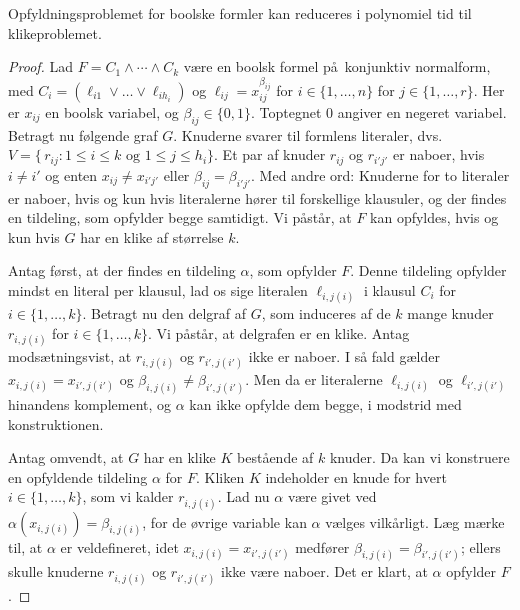 \begin{lemma} 
  Opfyldningsproblemet for boolske formler kan reduceres i polynomiel tid til klikeproblemet.
\end{lemma}

\begin{proof} 
  Lad $F = C_1 \wedge \cdots \wedge C_k$ være en boolsk formel på konjunktiv normalform, med 
  $C_i = (\ell_{i1} \vee \ldots \vee \ell_{ih_i})$ og $\ell_{ij} = x_{ij}^{\beta_{ij}}$ for $i\in\{1,\ldots, n\}$ for $j\in\{1,\ldots,r\}$. 
  Her er $x_{ij}$ en boolsk variabel, og $\beta_{ij} \in \{0,1\}$.
  Toptegnet $0$ angiver en negeret variabel. 
  Betragt nu følgende graf $G$.
  Knuderne svarer til formlens literaler, dvs.  $V = \{\,r_{ij}\colon 1 \le i \le k \text{ og } 1 \le j \le h_i\}$.
  Et par af knuder $r_{ij}$ og $r_{i'j'}$ er naboer, hvis $i \not= i'$ og enten $x_{ij} \not= x_{i'j'}$ eller $\beta_{ij} = \beta_{i'j'}$.
  Med andre ord:
  Knuderne for to literaler er naboer, hvis og kun hvis literalerne hører til forskellige klausuler, og der findes en tildeling, som opfylder begge samtidigt.
  Vi påstår, at $F$ kan opfyldes, hvis og kun hvis $G$ har en klike af størrelse $k$.

  Antag først, at der findes en tildeling $\alpha$, som opfylder $F$.
  Denne tildeling opfylder mindst en literal per klausul, lad os sige literalen
  $\ell_{i,j(i)}$ i klausul $C_{i}$ for $i\in\{1,\ldots, k\}$.     
  Betragt nu den delgraf af $G$, som induceres af de $k$ mange knuder $r_{i,j(i)}$ for  $i\in\{1 ,\ldots, k\}$. 
  Vi påstår, at delgrafen er en klike.
  Antag modsætningsvist, at $r_{i,j(i)}$ og $r_{i',j(i')}$ ikke er naboer.          
  I så fald gælder $x_{i,j(i)} = x_{i',j(i')}$ og $\beta_{i,j(i)} \not= \beta_{i',j(i')}$.
  Men da er literalerne $\ell_{i,j(i)}$ og $\ell_{i',j(i')}$ hinandens komplement, og $\alpha$ kan ikke opfylde dem begge, i modstrid med konstruktionen.

  Antag omvendt, at $G$ har en klike $K$ bestående af $k$ knuder.
  Da kan vi konstruere en opfyldende tildeling $\alpha$ for $F$.
  Kliken $K$ indeholder en knude for hvert $i\in\{1,\ldots, k\}$, som vi kalder $r_{i,j(i)}$.
  Lad nu $\alpha$ være givet ved $\alpha(x_{i,j(i)}) = \beta_{i,j(i)}$, for de øvrige variable kan $\alpha$ vælges vilkårligt.
  Læg mærke til, at $\alpha$ er veldefineret, idet $x_{i,j(i)} = x_{i',j(i')}$ medfører $\beta_{i,j(i)} = \beta_{i',j(i')}$;
  ellers skulle knuderne $r_{i,j(i)}$ og $r_{i',j(i')}$ ikke være naboer. 
  Det er klart, at $\alpha$ opfylder $F$.
\end{proof}

